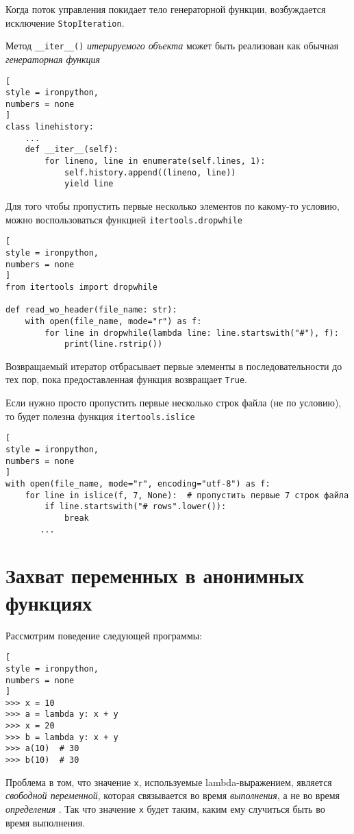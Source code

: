 \documentclass[%
	11pt,
	a4paper,
	utf8,
		]{article}
\begin{document}
Когда поток управления покидает тело генераторной функции, возбуждается исключение \texttt{StopIteration}.

Метод \verb|__iter__()| \emph{итерируемого объекта} может быть реализован как обычная \emph{генераторная функция} \cite[]{beazley:python_cookbook-2019}
\begin{lstlisting}[
style = ironpython,
numbers = none
]
class linehistory:
    ...
    def __iter__(self):
        for lineno, line in enumerate(self.lines, 1):
            self.history.append((lineno, line))
            yield line
\end{lstlisting}

Для того чтобы пропустить первые несколько элементов по какому-то условию, можно воспользоваться функцией \texttt{itertools.dropwhile}
\begin{lstlisting}[
style = ironpython,
numbers = none
]
from itertools import dropwhile

def read_wo_header(file_name: str):
    with open(file_name, mode="r") as f:
        for line in dropwhile(lambda line: line.startswith("#"), f):
            print(line.rstrip())
\end{lstlisting}

Возвращаемый итератор отбрасывает первые элементы в последовательности до тех пор, пока предоставленная функция возвращает \texttt{True}.

Если нужно просто пропустить первые несколько строк файла (не по условию), то будет полезна функция \texttt{itertools.islice}
\begin{lstlisting}[
style = ironpython,
numbers = none
]
with open(file_name, mode="r", encoding="utf-8") as f:
    for line in islice(f, 7, None):  # пропустить первые 7 строк файла
        if line.startswith("# rows".lower()):
            break
       ...
\end{lstlisting}

\section{Захват переменных в анонимных функциях}

Рассмотрим поведение следующей программы:
\begin{lstlisting}[
style = ironpython,
numbers = none
]
>>> x = 10
>>> a = lambda y: x + y
>>> x = 20
>>> b = lambda y: x + y
>>> a(10)  # 30
>>> b(10)  # 30
\end{lstlisting}

Проблема в том, что значение \texttt{x}, используемые lambda-выражением, является \emph{свободной переменной}, которая связывается во время \emph{выполнения}, а не во время \emph{определения} \cite[]{beazley:python_cookbook-2019}. Так что значение \texttt{x} будет таким, каким ему случиться быть во время выполнения.
\end{document}
